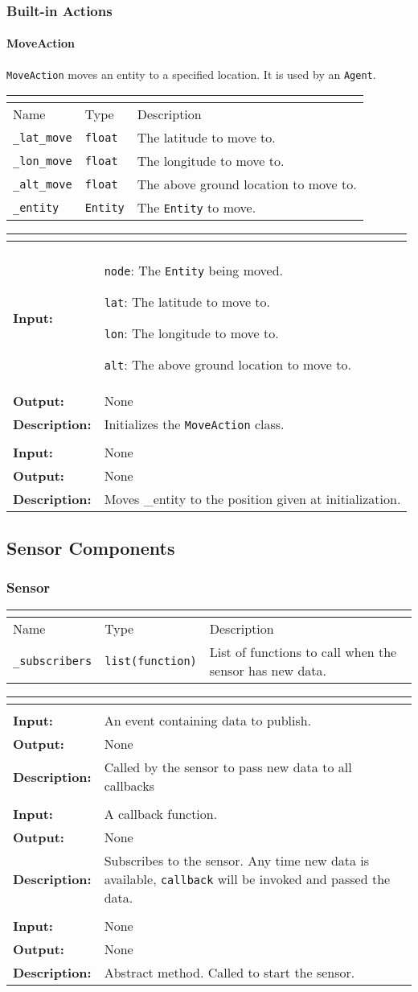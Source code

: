 \documentclass[titlepage]{article}
\renewenvironment{itemize*}
    {\begin{itemize}
        \setlength{\itemsep}{0pt}%
        \setlength{\parskip}{0pt}%
        \setlength{\partopsep}{0pt}%
        \setlength{\topsep}{0pt}}%
    {\end{itemize}}
\newcommand{\operations}[1]{
\begin{center}
    \begin{longtable}{|p{4cm}|p{10cm + 2.0\tabcolsep}|}
    \hline
    \multicolumn{2}{|l|}{\cellcolor[gray]{0.5}{\textbf{Operations}}} \\ \hline
#1
    \end{longtable}
\end{center}
}
\newcommand{\operation}[4]{
    \hline
    \multicolumn{2}{|l|}{\cellcolor[gray]{0.8}{\texttt{#1}}} \\ \hline
    \hspace{7pt}\textbf{Input:} & #2 \\ \hline
    \hspace{7pt}\textbf{Output:} & #3 \\ \hline
    \hspace{7pt}\textbf{Description:} & #4 \\ \hline
}
\newcommand{\attributes}[1]{
    \begin{center}
        \begin{tabular}{|p{3.5cm}|p{3.5cm}|p{7cm}|}
            \multicolumn{3}{|l|}{\cellcolor[gray]{0.5}{\textbf{Attributes}}} \\ \hline
            \rowcolor[gray]{0.8} Name & Type & Description \\ \hline 
            #1
        \end{tabular}
    \end{center}
}
\newcommand{\attribute}[3]{
    \texttt{#1} & \texttt{#2} & #3 \\ \hline
}
\begin{document}
\subsubsection{Built-in Actions}
\paragraph{MoveAction}
{\texttt{MoveAction} moves an entity to a specified location. It is used by an \texttt{Agent}.}

\attributes{
    \attribute{\_lat\_move}{float}{The latitude to move to.}
    \attribute{\_lon\_move}{float}{The longitude to move to.}
    \attribute{\_alt\_move}{float}{The above ground location to move to.}
    \attribute{\_entity}{\texttt{Entity}}{The \texttt{Entity} to move.}
}

\operations{
    \operation{\_\_init\_\_(node,lat,lon,alt)}
    {
        \begin{itemize*}
            \item \texttt{node}: The \texttt{Entity} being moved. 
            \item \texttt{lat}: The latitude to move to. 
            \item \texttt{lon}: The longitude to move to. 
            \item \texttt{alt}: The above ground location to move to. 
        \end{itemize*}
    }{None}{Initializes the \texttt{MoveAction} class.}
    \operation{perform()}{None}{None}{Moves \_entity to the position given at initialization.}
}

\subsection{Sensor Components}
\subsubsection{Sensor}
\attributes
{
    \attribute{\_subscribers}{list(function)}{List of functions to call when the sensor has new data.}
}

\operations
{
    \operation{\_publish\_data(event)}{An event containing data to publish.}{None}{Called by the sensor to pass new data to all callbacks}
    \operation{subscribe(callback)}{A callback function.}{None}{Subscribes to the sensor.  Any time new data is available, \texttt{callback} will be invoked and passed the data.}
    \operation{run()}{None}{None}{Abstract method.  Called to start the sensor.}
}
\end{document}
